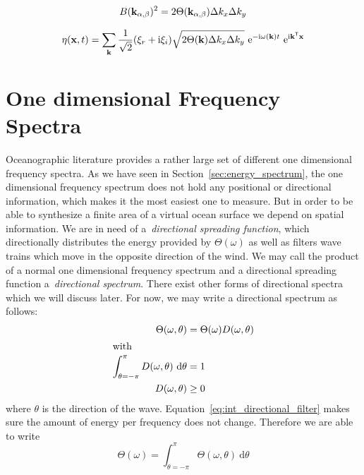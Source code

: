 \begin{equation}
 B(\mathbf{k}_{\alpha,\beta})^2 = 2\Theta(\mathbf{k}_{\alpha,\beta})\Delta 
k_x\Delta k_y
\end{equation}

\begin{equation}
 \eta(\mathbf{x}, t) = 
\sum_{\mathbf{k}}\frac{1}{\sqrt{2}}(\xi_r+\mathrm{i}\xi_i)\sqrt{2\Theta(\mathbf{k})
\Delta k_x \Delta k_y}~\mathrm{e}^{-\mathrm{i}\omega(\mathbf{k}) 
t}~\mathrm{e}^{\mathrm{i}\mathbf{k}^{\mathsf{T}}\mathbf{x}}
\end{equation}


%
\section{One dimensional Frequency Spectra}
Oceanographic literature provides a rather large set of different one
dimensional frequency spectra. As we have seen in
Section~\ref{sec:energy_spectrum}, the one dimensional frequency spectrum does
not hold any positional or directional information, which makes it the most
easiest one to measure. But in order to be able to synthesize a finite area of a
virtual ocean surface we depend on spatial information. We are in need of
a~\emph{directional spreading function}, which directionally distributes the
energy provided by $\Theta(\omega)$ as well as filters wave trains which move in
the opposite direction of the wind. We may call the product of a normal one
dimensional frequency spectrum and a directional spreading function
a~\emph{directional spectrum}. There exist other forms of directional spectra
which we will discuss later. For now, we may write a directional spectrum as
follows:
\begin{subequations}
\begin{align}
\label{eq:directional_frequency_spectrum}
 \Theta(\omega, \theta) &= \Theta(\omega)D(\omega,\theta) \\
\intertext{with}
\label{eq:int_directional_filter}
\int_{\theta=-\pi}^{\pi}D(\omega,\theta)~\mathrm{d}\theta &= 1 \\
D(\omega,\theta) &\geq 0
\end{align}
\end{subequations}
where $\theta$ is the direction of the wave.
Equation~\ref{eq:int_directional_filter} makes sure the amount of energy per
frequency does not change. Therefore we are able to write
\begin{equation}
 \Theta(\omega) = \int_{\theta=-\pi}^{\pi}\Theta(\omega,
\theta)~\mathrm{d}\theta
\end{equation}

